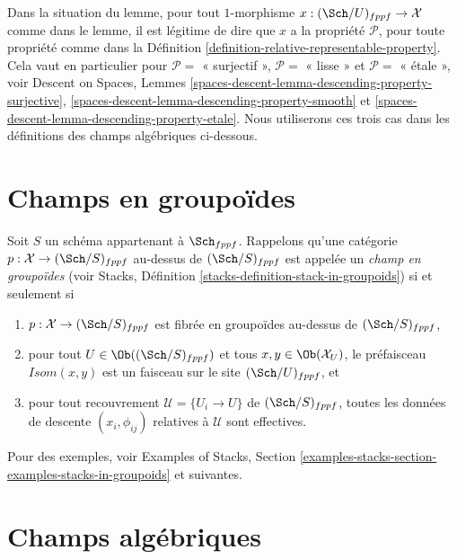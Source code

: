 \noindent
Dans la situation du lemme, pour tout $1$-morphisme
$x : (\Sch/U)_{fppf} \to \mathcal{X}$ comme dans le lemme, il est légitime
de dire que $x$ a la propriété $\mathcal{P}$, pour toute propriété comme dans la
Définition \ref{definition-relative-representable-property}.
Cela vaut en particulier pour
$\mathcal{P} = $ « surjectif »,
$\mathcal{P} = $ « lisse » et
$\mathcal{P} = $ « \'etale »,
voir
Descent on Spaces,
Lemmes \ref{spaces-descent-lemma-descending-property-surjective},
\ref{spaces-descent-lemma-descending-property-smooth} et
\ref{spaces-descent-lemma-descending-property-etale}.
Nous utiliserons ces trois cas dans les définitions
des champs algébriques ci-dessous.








\section{Champs en groupoïdes}
\label{section-stacks}

\noindent
Soit $S$ un schéma appartenant à $\Sch_{fppf}$.
Rappelons qu'une catégorie $p : \mathcal{X} \to (\Sch/S)_{fppf}$
au-dessus de $(\Sch/S)_{fppf}$ est appelée un
{\it champ en groupoïdes} (voir
Stacks, Définition \ref{stacks-definition-stack-in-groupoids})
si et seulement si
\begin{enumerate}
\item $p : \mathcal{X} \to (\Sch/S)_{fppf}$ est fibrée
en groupoïdes au-dessus de $(\Sch/S)_{fppf}$,
\item pour tout $U \in \Ob((\Sch/S)_{fppf})$ et
tous $x, y\in \Ob(\mathcal{X}_U)$, le préfaisceau
$\mathit{Isom}(x, y)$ est un faisceau sur le site $(\Sch/U)_{fppf}$, et
\item pour tout recouvrement $\mathcal{U} = \{U_i \to U\}$ de
$(\Sch/S)_{fppf}$, toutes les données de descente $(x_i, \phi_{ij})$
relatives à $\mathcal{U}$ sont effectives.
\end{enumerate}
Pour des exemples, voir
Examples of Stacks,
Section \ref{examples-stacks-section-examples-stacks-in-groupoids}
et suivantes.










\section{Champs algébriques}
\label{section-algebraic-stacks}

